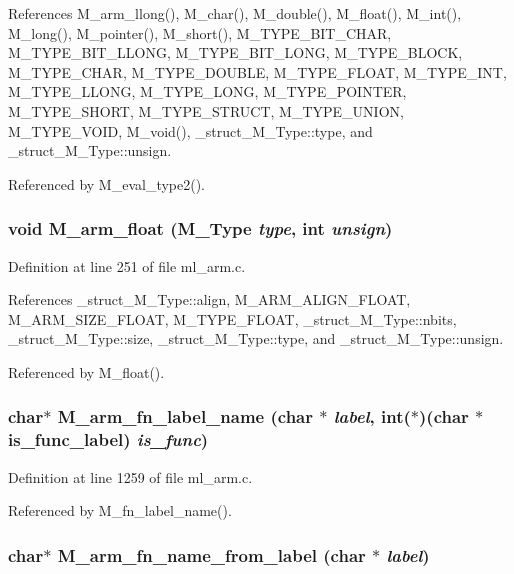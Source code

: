 References M\_\-arm\_\-llong(), M\_\-char(), M\_\-double(), M\_\-float(), M\_\-int(), M\_\-long(), M\_\-pointer(), M\_\-short(), M\_\-TYPE\_\-BIT\_\-CHAR, M\_\-TYPE\_\-BIT\_\-LLONG, M\_\-TYPE\_\-BIT\_\-LONG, M\_\-TYPE\_\-BLOCK, M\_\-TYPE\_\-CHAR, M\_\-TYPE\_\-DOUBLE, M\_\-TYPE\_\-FLOAT, M\_\-TYPE\_\-INT, M\_\-TYPE\_\-LLONG, M\_\-TYPE\_\-LONG, M\_\-TYPE\_\-POINTER, M\_\-TYPE\_\-SHORT, M\_\-TYPE\_\-STRUCT, M\_\-TYPE\_\-UNION, M\_\-TYPE\_\-VOID, M\_\-void(), \_\-struct\_\-M\_\-Type::type, and \_\-struct\_\-M\_\-Type::unsign.

Referenced by M\_\-eval\_\-type2().
\subsubsection{\setlength{\rightskip}{0pt plus 5cm}void M\_\-arm\_\-float (\bf{M\_\-Type} {\em type}, int {\em unsign})}\label{ml__arm_8c_44bd6fdd6aa344860f27f70f1893a2b6}




Definition at line 251 of file ml\_\-arm.c.

References \_\-struct\_\-M\_\-Type::align, M\_\-ARM\_\-ALIGN\_\-FLOAT, M\_\-ARM\_\-SIZE\_\-FLOAT, M\_\-TYPE\_\-FLOAT, \_\-struct\_\-M\_\-Type::nbits, \_\-struct\_\-M\_\-Type::size, \_\-struct\_\-M\_\-Type::type, and \_\-struct\_\-M\_\-Type::unsign.

Referenced by M\_\-float().
\subsubsection{\setlength{\rightskip}{0pt plus 5cm}char$\ast$ M\_\-arm\_\-fn\_\-label\_\-name (char $\ast$ {\em label}, int($\ast$)(char $\ast$is\_\-func\_\-label) {\em is\_\-func})}\label{ml__arm_8c_ec976c50611bfcf2982cd6e04abca3a7}




Definition at line 1259 of file ml\_\-arm.c.

Referenced by M\_\-fn\_\-label\_\-name().
\subsubsection{\setlength{\rightskip}{0pt plus 5cm}char$\ast$ M\_\-arm\_\-fn\_\-name\_\-from\_\-label (char $\ast$ {\em label})}\label{ml__arm_8c_1f1ec2f67c6cc20fca9edc19e6d280ad}




